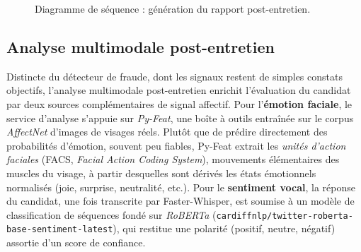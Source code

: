 \begin{figure}[H]
{%
  }
  \caption{Diagramme de séquence : génération du rapport post-entretien.}
  \label{fig:seq-report}
\end{figure}

\subsection{Analyse multimodale post-entretien}

Distincte du détecteur de fraude, dont les signaux restent de simples constats objectifs, l'analyse multimodale post-entretien enrichit l'évaluation du candidat par deux sources complémentaires de signal affectif. Pour l'\textbf{émotion faciale}, le service d'analyse s'appuie sur \textit{Py-Feat}, une boîte à outils entraînée sur le corpus \textit{AffectNet} d'images de visages réels. Plutôt que de prédire directement des probabilités d'émotion, souvent peu fiables, Py-Feat extrait les \textit{unités d'action faciales} (FACS, \textit{Facial Action Coding System}), mouvements élémentaires des muscles du visage, à partir desquelles sont dérivés les états émotionnels normalisés (joie, surprise, neutralité, etc.). Pour le \textbf{sentiment vocal}, la réponse du candidat, une fois transcrite par Faster-Whisper, est soumise à un modèle de classification de séquences fondé sur \textit{RoBERTa} (\texttt{cardiffnlp/\allowbreak twitter-roberta-base-\allowbreak sentiment-latest}), qui restitue une polarité (positif, neutre, négatif) assortie d'un score de confiance.

